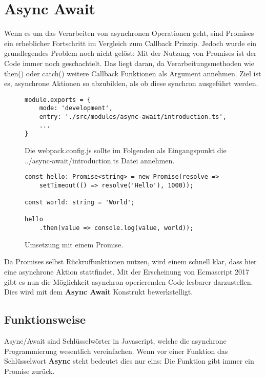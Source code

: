 \section{Async Await}
Wenn es um das Verarbeiten von asynchronen Operationen geht, sind Promises ein erheblicher Fortschritt im Vergleich zum Callback Prinzip. Jedoch wurde ein grundlegendes Problem noch nicht gelöst: Mit der Nutzung von Promises ist der Code immer noch geschachtelt. Das liegt daran, da Verarbeitungsmethoden wie then() oder catch() weitere Callback Funktionen als Argument annehmen. Ziel ist es, asynchrone Aktionen so abzubilden, als ob diese synchron ausgeführt werden. 

\begin{figure}[H]
\begin{lstlisting}[basicstyle=\small]
module.exports = {
    mode: 'development',
    entry: './src/modules/async-await/introduction.ts',
    ...
}
\end{lstlisting}
\caption{Die webpack.config.js sollte im Folgenden als Eingangspunkt die ../async-await/introduction.ts Datei annehmen.}
\end{figure}

\begin{figure}[H]
\begin{lstlisting}[basicstyle=\small]
const hello: Promise<string> = new Promise(resolve =>
    setTimeout(() => resolve('Hello'), 1000));
    
const world: string = 'World';

hello
    .then(value => console.log(value, world));
\end{lstlisting}
\caption{Umsetzung mit einem Promise.}
\label{Promise-comparison-async-await}
\end{figure}

\noindent
Da Promises selbst Rückruffunktionen nutzen, wird einem schnell klar, dass hier eine asynchrone Aktion stattfindet. Mit der Erscheinung von Ecmascript 2017 gibt es nun die Möglichkeit asynchron operierenden Code lesbarer darzustellen. Dies wird mit dem \textbf{Async Await} Konstrukt bewerkstelligt. 

\subsection{Funktionsweise}

Async/Await sind Schlüsselwörter in Javascript, welche die asynchrone Programmierung wesentlich vereinfachen. Wenn vor einer Funktion das Schlüsselwort \textbf{Async} steht bedeutet dies nur eins: Die Funktion gibt immer ein Promise zurück.

